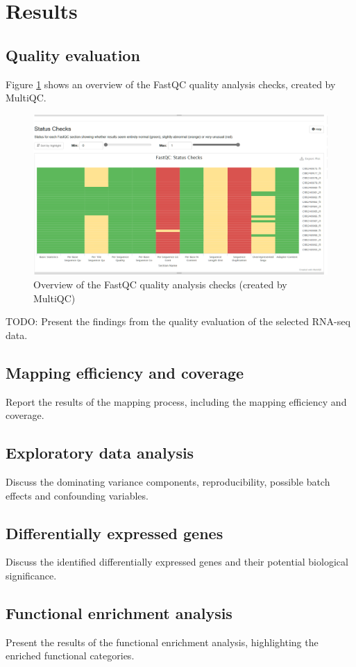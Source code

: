 \section{Results}

\subsection{Quality evaluation}

Figure \ref{fig:0.1-MultiQC_FastQC_status_checks} shows an overview of the FastQC quality analysis checks, created by MultiQC.

\begin{figure}[htbp]
    \caption{Overview of the FastQC quality analysis checks (created by MultiQC)}
    \label{fig:0.1-MultiQC_FastQC_status_checks}
    \includegraphics[width=\textwidth]{../../results/multiqc/Screenshots/0.1-MultiQC_FastQC_status_checks.png}
\end{figure}


TODO: Present the findings from the quality evaluation of the selected RNA-seq data.

\subsection{Mapping efficiency and coverage}
Report the results of the mapping process, including the mapping efficiency and coverage.

\subsection{Exploratory data analysis}
Discuss the dominating variance components, reproducibility, possible batch effects and confounding variables.

\subsection{Differentially expressed genes}
Discuss the identified differentially expressed genes and their potential biological significance.

\subsection{Functional enrichment analysis}
Present the results of the functional enrichment analysis, highlighting the enriched functional categories.